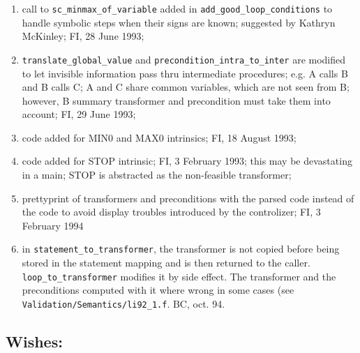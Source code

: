 \begin{enumerate}
  \item call to \verb+sc_minmax_of_variable+ added in
        \verb+add_good_loop_conditions+ to handle symbolic steps
        when their signs are known; suggested by Kathryn McKinley;
        FI, 28 June 1993;

  \item \verb+translate_global_value+ and
        \verb+precondition_intra_to_inter+ are modified to let invisible
        information pass thru intermediate procedures; e.g. A calls B
        and B calls C; A and C share common variables, which are not
        seen from B; however, B summary transformer and precondition
        must take them into account; FI, 29 June 1993;

  \item code added for MIN0 and MAX0 intrinsics; FI, 18 August 1993;

  \item code added for STOP intrinsic; FI, 3 February 1993; this may be
        devastating in a main; STOP is abstracted as the non-feasible
        transformer;

  \item prettyprint of transformers and preconditions with the parsed
        code instead of the code to avoid display troubles introduced by
        the controlizer; FI, 3 February 1994

      \item in {\tt statement\_to\_transformer}, the transformer is not
        copied before being stored in the statement mapping and is then
        returned to the caller. {\tt loop\_to\_transformer} modifies it by
        side effect. The transformer and the preconditions computed with it
        where wrong in some cases (see {\tt
        Validation/Semantics/li92\_1.f}. BC, oct. 94.
\end{enumerate}

\subsection{Wishes:}

